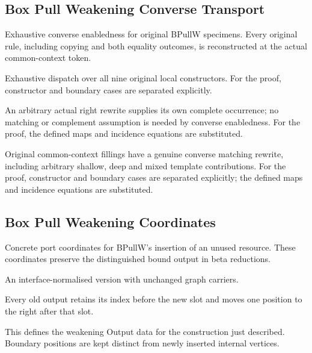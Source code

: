 \subsection{Box Pull Weakening Converse Transport}
Exhaustive converse enabledness for original BPullW specimens. Every original rule, including copying and both equality outcomes, is reconstructed at the actual common-context token.

Exhaustive dispatch over all nine original local constructors.
For the proof, constructor and boundary cases are separated explicitly.
\par{}

An arbitrary actual right rewrite supplies its own complete occurrence; no matching or complement assumption is needed by converse enabledness.
For the proof, the defined maps and incidence equations are substituted.
\par{}

Original common-context fillings have a genuine converse matching rewrite, including arbitrary shallow, deep and mixed template contributions.
For the proof, constructor and boundary cases are separated explicitly; the defined maps and incidence equations are substituted.
\par{}

\subsection{Box Pull Weakening Coordinates}
Concrete port coordinates for BPullW's insertion of an unused resource. These coordinates preserve the distinguished bound output in beta reductions.

An interface-normalised version with unchanged graph carriers.
\par{}

Every old output retains its index before the new slot and moves one position to the right after that slot.
\par{}

This defines the weakening Output data for the construction just described. Boundary positions are kept distinct from newly inserted internal vertices.
\par{}

